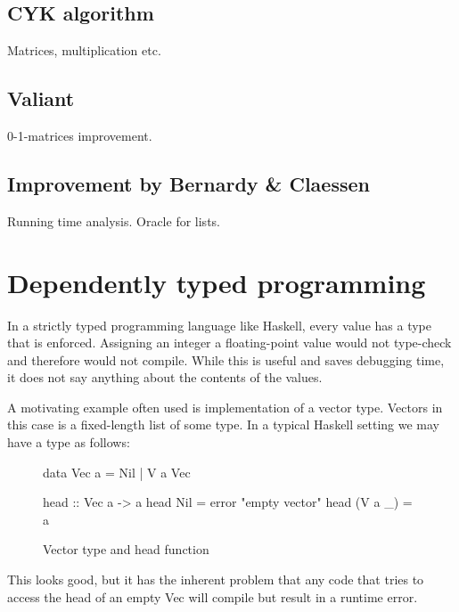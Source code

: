 \documentclass[a4paper,12pt,twosided]{report}
\begin{document}
\subsection{CYK algorithm}
Matrices, multiplication etc. 

\subsection{Valiant}
0-1-matrices improvement. 
\subsection{Improvement by Bernardy \& Claessen}
Running time analysis. Oracle for lists. 

\section{Dependently typed programming}
In a strictly typed programming language like Haskell, every value has a type
that is enforced. Assigning an integer a floating-point value would not
type-check and therefore would not compile. While this is useful and saves
debugging time, it does not say anything about the contents of the values.

A motivating example often used is implementation of a vector type. Vectors in
this case is a fixed-length list of some type. In a typical Haskell setting we 
may have a type as follows:
\begin{figure}[H]
\begin{code}
data Vec a = Nil | V a Vec

head :: Vec a -> a
head Nil = error "empty vector"
head (V a _) = a
\end{code}
\caption{Vector type and head function}
\end{figure}
This looks good, but it has the inherent problem that any code that tries to
access the head of an empty Vec will compile but result in a runtime error. 
\end{document}
